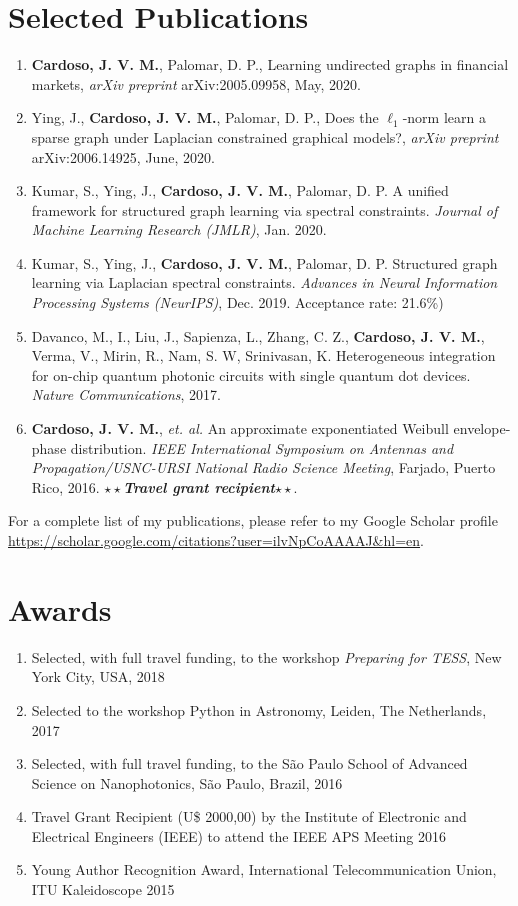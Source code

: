 \documentclass[10pt]{article}
\begin{document}
\begin{titlepage}
\section*{Selected Publications}
\begin{enumerate}
  \item \textbf{Cardoso, J. V. M.}, Palomar, D. P., Learning undirected graphs in financial markets, \textit{arXiv preprint} arXiv:2005.09958, May, 2020.
  \item Ying, J., \textbf{Cardoso, J. V. M.}, Palomar, D. P., Does the $\ell_1$-norm learn a sparse graph under Laplacian constrained graphical models?, \textit{arXiv preprint} arXiv:2006.14925, June, 2020.
  \item Kumar, S., Ying, J., \textbf{Cardoso, J. V. M.}, Palomar, D. P. A unified framework for structured graph
    learning via spectral constraints. \textit{Journal of Machine Learning Research (JMLR)}, Jan. 2020.
  \item Kumar, S., Ying, J., \textbf{Cardoso, J. V. M.}, Palomar, D. P. Structured graph learning via Laplacian
    spectral constraints. \textit{Advances in Neural Information Processing Systems (NeurIPS)}, Dec. 2019. Acceptance rate: 21.6\%)
\item Davanco, M., I., Liu, J., Sapienza, L., Zhang, C. Z., \textbf{Cardoso, J. V. M.}, Verma, V., Mirin, R., Nam,
S. W, Srinivasan, K. Heterogeneous integration for on-chip quantum photonic circuits with single quantum dot devices.
\textit{Nature Communications}, 2017.
\item \textbf{Cardoso, J. V. M.}, \textit{et. al.} An approximate exponentiated Weibull envelope-phase distribution.
\textit{IEEE International Symposium on Antennas and Propagation/USNC-URSI National Radio Science Meeting}, Farjado, Puerto Rico, 2016.
$\star\star$\textbf{\textit{Travel grant recipient}}$\star\star$.
\end{enumerate}

For a complete list of my publications, please refer to my Google Scholar profile \url{https://scholar.google.com/citations?user=ilvNpCoAAAAJ&hl=en}.

\section*{Awards}
\begin{enumerate}
  \item Selected, with full travel funding, to the workshop \textit{Preparing for TESS}, New York City, USA, 2018
  \item Selected to the workshop \textsf{Python} in Astronomy, Leiden, The Netherlands, 2017
  \item Selected, with full travel funding, to the S\~ao Paulo School of Advanced Science on Nanophotonics, S\~ao Paulo, Brazil, 2016
  \item Travel Grant Recipient (U\$ 2000,00) by the Institute of Electronic and Electrical Engineers (IEEE) to attend the IEEE APS Meeting 2016
  \item Young Author Recognition Award, International Telecommunication Union, ITU Kaleidoscope 2015
\end{enumerate}


\end{titlepage}
\end{document}
